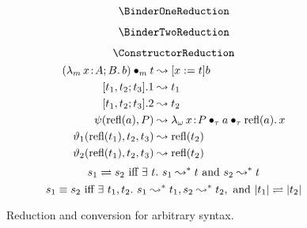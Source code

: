 
\begin{figure}
    \centering
    \begin{minipage}{0.5\textwidth}
        $$\BinderOneReduction$$
    \end{minipage}%
    \begin{minipage}{0.5\textwidth}
        $$\BinderTwoReduction$$
    \end{minipage}
    $$\ConstructorReduction$$
    \begin{align*}
        ({\lambda_m}\, x\! : \! A;B.\, b) \bullet_{m} t &\leadsto [x := t]b \\
        [t_1, t_2; t_3].1 &\leadsto t_1 \\
        [t_1, t_2; t_3].2 &\leadsto t_2 \\
        \psi(\text{refl}(a),P) &\leadsto {\lambda_\omega}\, x\! : \! P \bullet_{\tau} a \bullet_{\tau} \text{refl}(a).\, x \\
        \vartheta_1(\text{refl}(t_1), t_2, t_3) &\leadsto \text{refl}(t_2) \\
        \vartheta_2(\text{refl}(t_1), t_2, t_3) &\leadsto \text{refl}(t_2) \\
    \end{align*}
    \vspace{-.4in}
    $$s_1 \rightleftharpoons s_2 \text{ iff } \exists\ t.\ s_1 \leadsto^* t \text{ and } s_2 \leadsto^* t$$
    $$s_1 \equiv s_2 \text{ iff } \exists\ t_1, t_2.\ s_1 \leadsto^* t_1, s_2 \leadsto^* t_2, \text{ and } |t_1| \rightleftharpoons |t_2|$$
    \caption{Reduction and conversion for arbitrary syntax.}
    \label{fig:reduction}
\end{figure}


